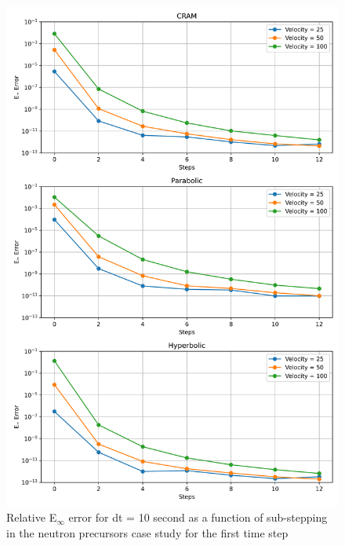 \begin{figure}[p]
    \centering
    \includegraphics[width=5in]{images/chapter-5/caseStudies/neutronPrecursors/dt10/neutronPrecursorsEinfErrorerrorWithSteps.png}
    \caption{Relative E$_{\infty}$ error for dt = 10 second as a function of sub-stepping in the neutron precursors case study for the first time step}
    \label{fig:neutron_precursors_Einf_dt10_with_substeps}
\end{figure}

\clearpage

